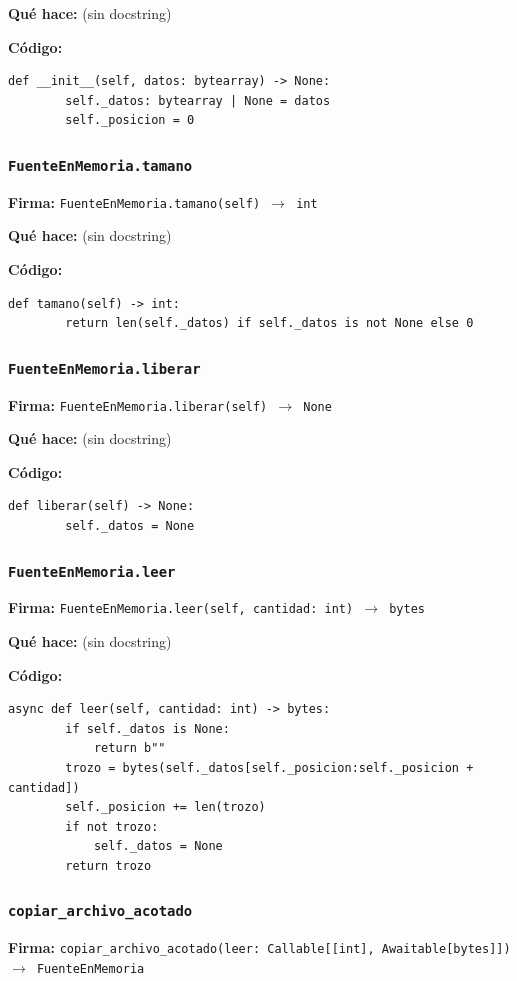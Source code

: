 \documentclass[11pt,a4paper]{article}
\begin{document}
\textbf{Qué hace:} (sin docstring)

\textbf{Código:}
\begin{lstlisting}
def __init__(self, datos: bytearray) -> None:
        self._datos: bytearray | None = datos
        self._posicion = 0
\end{lstlisting}

\subsubsection*{\texttt{FuenteEnMemoria.tamano}}
\textbf{Firma:} \texttt{FuenteEnMemoria.tamano(self) $\rightarrow$ int}

\textbf{Qué hace:} (sin docstring)

\textbf{Código:}
\begin{lstlisting}
def tamano(self) -> int:
        return len(self._datos) if self._datos is not None else 0
\end{lstlisting}

\subsubsection*{\texttt{FuenteEnMemoria.liberar}}
\textbf{Firma:} \texttt{FuenteEnMemoria.liberar(self) $\rightarrow$ None}

\textbf{Qué hace:} (sin docstring)

\textbf{Código:}
\begin{lstlisting}
def liberar(self) -> None:
        self._datos = None
\end{lstlisting}

\subsubsection*{\texttt{FuenteEnMemoria.leer}}
\textbf{Firma:} \texttt{FuenteEnMemoria.leer(self, cantidad: int) $\rightarrow$ bytes}

\textbf{Qué hace:} (sin docstring)

\textbf{Código:}
\begin{lstlisting}
async def leer(self, cantidad: int) -> bytes:
        if self._datos is None:
            return b""
        trozo = bytes(self._datos[self._posicion:self._posicion + cantidad])
        self._posicion += len(trozo)
        if not trozo:
            self._datos = None
        return trozo
\end{lstlisting}

\subsubsection*{\texttt{copiar\_archivo\_acotado}}
\textbf{Firma:} \texttt{copiar\_archivo\_acotado(leer: Callable[[int], Awaitable[bytes]]) $\rightarrow$ FuenteEnMemoria}
\end{document}

